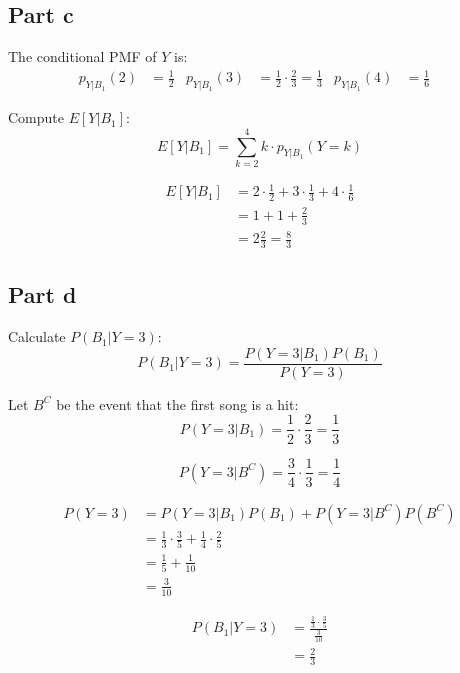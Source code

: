 \subsection{Part c}
The conditional PMF of $Y$ is:
\begin{align*}
	p_{Y|B_1}(2) & = \frac{1}{2}                                &
	p_{Y|B_1}(3) & = \frac{1}{2}\cdot \frac{2}{3} = \frac{1}{3} &
	p_{Y|B_1}(4) & = \frac{1}{6}                                &
\end{align*}

Compute $E[Y|B_1]$:
\[
	E[Y|B_1] = \sum_{k=2}^{4} k \cdot p_{Y|B_1}(Y=k)
\]

\begin{align*}
	E[Y|B_1] & = 2 \cdot \frac{1}{2} + 3 \cdot \frac{1}{3} + 4 \cdot \frac{1}{6} \\
	         & = 1 + 1 + \frac{2}{3}                                             \\
	         & = 2\frac{2}{3} = \frac{8}{3}
\end{align*}

\subsection{Part d}
Calculate $P(B_1|Y=3)$:
\[
	P(B_1|Y=3) = \frac{P(Y=3|B_1)P(B_1)}{P(Y=3)}
\]

Let $B^C$ be the event that the first song is a hit:
\[
	P(Y=3|B_1) = \frac{1}{2}\cdot\frac{2}{3} = \frac{1}{3}
\]

\[
	P(Y=3|B^C) = \frac{3}{4}\cdot \frac{1}{3} = \frac{1}{4}
\]

\begin{align*}
	P(Y=3) & = P(Y=3|B_1)P(B_1) + P(Y=3|B^C)P(B^C)                           \\
	       & = \frac{1}{3} \cdot \frac{3}{5} + \frac{1}{4} \cdot \frac{2}{5} \\
	       & = \frac{1}{5} + \frac{1}{10}                                    \\
	       & = \frac{3}{10}
\end{align*}

\begin{align*}
	P(B_1|Y=3) & = \frac{\frac{1}{3} \cdot \frac{3}{5}}{\frac{3}{10}} \\
	           & = \frac{2}{3}
\end{align*}
